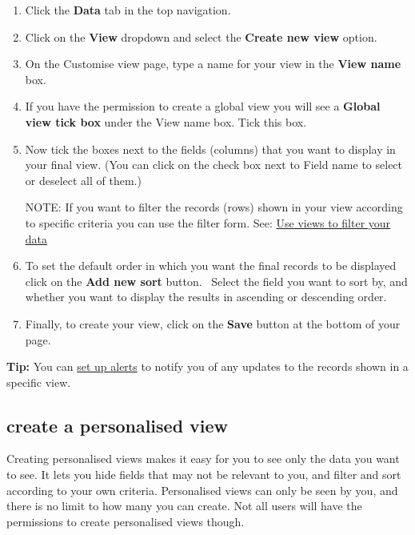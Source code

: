 \documentclass{ctrlo-int-toc}
\begin{document}
\begin{enumerate}
\item Click the \textbf{Data} tab in the top navigation.
\item Click on the \textbf{View} dropdown and select the \textbf{Create new view} option.
\item On the Customise view page, type a name for your view in the \textbf{View name} box.
\item If you have the permission to create a global view you will see a \textbf{Global view tick box} under the View name box. Tick this box. 
\item Now tick the boxes next to the fields (columns) that you want to display in your final view. (You can click on the check box next to Field name to select or deselect all of them.)
\begin{notebox}
NOTE: If you want to filter the records (rows) shown in your view according to specific criteria you can use the filter form. See: \hyperref[subsec:viewstofilter]{Use views to filter your data}
\end{notebox}

\item To set the default order in which you want the final records to be displayed click on the \textbf{Add new sort} button. \ Select the field you want to sort by, and whether you want to display the results in ascending or descending order.
\item Finally, to create your view, click on the \textbf{Save} button at the bottom of your page. 
\end{enumerate}
\begin{tipbox}[userdefinedwidth=15cm]
    \textbf{Tip:} You can \hyperref[subsec:setalert]{set up alerts} to notify you of any updates to the records shown in a specific view.
\end{tipbox}

\subsection[create a personalised view]{create a personalised view}
\label{subsec:personalview}
Creating personalised views makes it easy for you to see only the data you want to see. It lets you hide fields that may not be relevant to you, and filter and sort according to your own criteria. Personalised views can only be seen by you, and there is no limit to how many you can create. Not all users will have the permissions to create personalised views though. 
\end{document}
